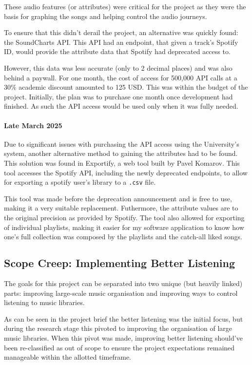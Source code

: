These audio features (or attributes) were critical for the project as they were the basis for graphing the songs and helping control the audio journeys.

To ensure that this didn't derail the project, an alternative was quickly found: the SoundCharts API. This API had an endpoint, that given a track's Spotify ID, would provide the attribute data that Spotify had deprecated access to.

However, this data was less accurate (only to 2 decimal places) and was also behind a paywall. For one month, the cost of access for 500,000 API calls at a 30\% academic discount amounted to 125 USD. This was within the budget of the project. Initially, the plan was to purchase one month once development had finished. As such the API access would be used only when it was fully needed.

\paragraph{Late March 2025} Due to significant issues with purchasing the API access using the University's system, another alternative method to gaining the attributes had to be found. This solution was found in Exportify, a web tool built by Pavel Komarov. This tool accesses the Spotify API, including the newly deprecated endpoints, to allow for exporting a spotify user's library to a \lstinline|.csv| file.

This tool was made before the deprecation announcement and is free to use, making it a very suitable replacement. Futhermore, the attribute values are to the original precision as provided by Spotify. The tool also allowed for exporting of individual playlists, making it easier for my software application to know how one's full collection was composed by the playlists and the catch-all liked songs.

\subsection{Scope Creep: Implementing Better Listening}
The goals for this project can be separated into two unique (but heavily linked) parts: improving large-scale music organisation and improving ways to control listening to music libraries.

As can be seen in the project brief the better listening was the initial focus, but during the research stage this pivoted to improving the organisation of large music libraries. When this pivot was made, improving better listening should've been re-classified as out of scope to ensure the project expectations remained manageable within the allotted timeframe.

